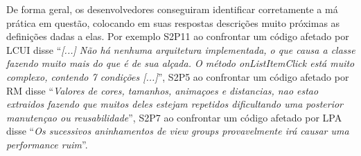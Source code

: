 De forma geral, os desenvolvedores conseguiram identificar corretamente a má prática em questão, colocando em suas respostas descrições muito próximas as definições dadas a elas. Por exemplo S2P11 ao confrontar um código afetado por LCUI disse ``\textit{[...] Não há nenhuma arquitetura implementada, o que causa a classe fazendo muito mais do que é de sua alçada. O método onListItemClick está muito complexo, contendo 7 condições [...]}'', S2P5 ao confrontar um código afetado por RM disse ``\textit{Valores de cores, tamanhos, animaçoes e distancias, nao estao extraidos fazendo que muitos deles estejam repetidos dificultando uma posterior manutençao ou reusabilidade}'', S2P7 ao confrontar um código afetado por LPA disse ``\textit{Os sucessivos aninhamentos de view groups provavelmente irá causar uma performance ruim}''.












